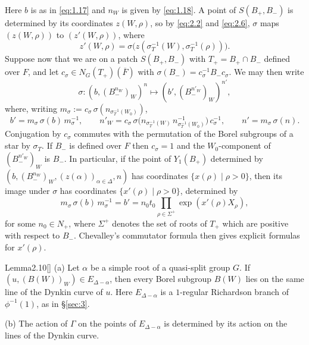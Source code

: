 \documentclass[12pt,letterpaper]{amsart}
\theoremstyle{plain}
\theoremstyle{definition}
\theoremstyle{remark}
\theoremstyle{definition}
\newcommand{\ovF}{\overline{F}}
\begin{document}
Here $b$ is as in \eqref{eq:1.17} and $n_W$ is given by \eqref{eq:1.18}.
A point of $S(B_+,B_-)$ is determined by
its coordinates $z(W,\rho)$, so by \eqref{eq:2.2} and \eqref{eq:2.6},
$\sigma$ maps $(z(W,\rho))$ to $(z'(W,\rho))$, where
\begin{equation}\tag{2.7}\label{eq:2.7}
z'(W,\rho)=\sigma\big(z(\sigma_T^{-1}(W),\sigma_T^{-1}(\rho))\big).
\end{equation}
Suppose now that we are on a patch $S(B_+,B_-)$ with
$T_+=B_+\cap B_-$ defined over $F$, and let
$c_\sigma\in N_G(T_+)(\ovF)$ with
$\sigma (B_-)=c_\sigma^{-1} B_-c_\sigma$. We may then write
\begin{equation}\tag{2.8}\label{eq:2.8}
\sigma:(b,(B_-^{n_W})_{W})^{n}\longmapsto
(b',(B_-^{n'_W})_{W})^{n'},
\end{equation}
where, writing $m_\sigma:=c_\sigma\,\sigma(n_{\sigma^{-1}_T (W_0)})$,
\[
b'= m_\sigma\,\sigma(b)\,m_\sigma^{-1},\qquad
n'_W=c_\sigma\,
\sigma\big(n_{\sigma^{-1}_T (W)}\,n^{-1}_{\sigma^{-1}_T (W_0)}\big)\,c_\sigma^{-1},\qquad
n'= m_\sigma\,\sigma(n).
\]
Conjugation by $c_\sigma$ commutes with the permutation of the Borel
subgroups of a star by $\sigma_T$.
If $B_-$ is defined over $F$ then $c_\sigma=1$ and the
$W_0$-component of $(B_-^{n'_W})_{W}$ is $B_-$.
In particular, if the point of $Y_1(B_+)$
determined by $(b,(B_-^{n_W})_{W},
(z(\alpha))_{\alpha\in\Delta},{n})$ has
coordinates $\{x(\rho)\mid \rho >0\}$, then its image
under $\sigma$ has coordinates $\{x'(\rho)\mid \rho >0\}$,
determined by
\begin{equation}\tag{2.9}\label{eq:2.9}
m_\sigma\,\sigma(b)\,m_\sigma^{-1}
=b'=n_0t_0\prod_{\rho\in\Sigma^+}\exp (x'(\rho)X_\rho),
\end{equation}
for some $n_0\in N_+$,
where $\Sigma^+$ denotes the set of roots of $T_+$
which are positive with respect to $B_-$.
Chevalley's commutator formula then gives explicit formulas for
$x'(\rho)$.

\begin{res}{Lemma}{2.10}[{\cite[proof of Lemma 5.3]{Ha89}}]\label{res:2.10}
\textup{(a)} Let $\alpha$ be a simple root of a quasi-split group $G$. If
$(u,(B(W))_{W})\in E_{\Delta-\alpha}$,
then every Borel subgroup $B(W)$ lies on the same line of the Dynkin curve of
$u$. Here $E_{\Delta-\alpha}$ is a $1$-regular Richardson branch
of $\phi^{-1}(1)$, as in \S\ref{sec:3}.

\textup{(b)} The action of $\Gamma$ on the points of $E_{\Delta-\alpha}$
is determined by its action on the lines of the Dynkin curve.
\end{res}
\end{document}
